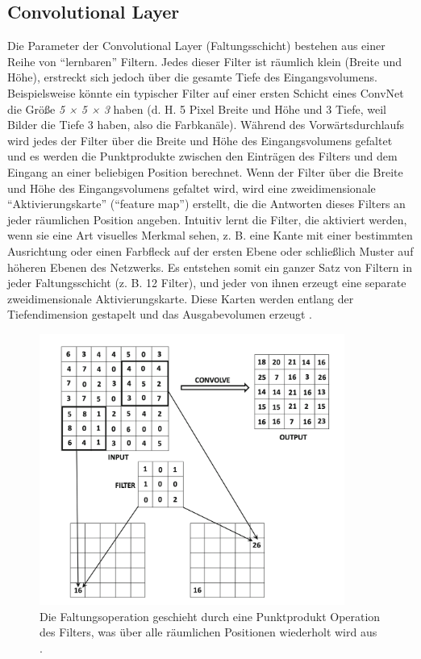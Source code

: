 \subsection{Convolutional Layer}

Die Parameter der Convolutional Layer (Faltungsschicht) bestehen aus einer Reihe von \enquote{lernbaren} Filtern. Jedes dieser Filter ist räumlich klein (Breite und Höhe), erstreckt sich jedoch über die gesamte Tiefe des Eingangsvolumens. Beispielsweise könnte ein typischer Filter auf einer ersten Schicht eines ConvNet die Größe \textit{5 × 5 × 3} haben (d. H. 5 Pixel Breite und Höhe und 3 Tiefe, weil Bilder die Tiefe 3 haben, also die Farbkanäle). Während des Vorwärtsdurchlaufs wird jedes der Filter über die Breite und Höhe des Eingangsvolumens gefaltet und es werden die Punktprodukte zwischen den Einträgen des Filters und dem Eingang an einer beliebigen Position berechnet. Wenn der Filter über die Breite und Höhe des Eingangsvolumens gefaltet wird, wird eine zweidimensionale \enquote{Aktivierungskarte} (\enquote{feature map}) erstellt, die die Antworten dieses Filters an jeder räumlichen Position angeben. Intuitiv lernt die Filter, die aktiviert werden, wenn sie eine Art visuelles Merkmal sehen, z. B. eine Kante mit einer bestimmten Ausrichtung oder einen Farbfleck auf der ersten Ebene oder schließlich Muster auf höheren Ebenen des Netzwerks. Es entstehen somit ein ganzer Satz von Filtern in jeder Faltungsschicht (z. B. 12 Filter), und jeder von ihnen erzeugt eine separate zweidimensionale Aktivierungskarte. Diese Karten werden entlang der Tiefendimension gestapelt und das Ausgabevolumen erzeugt \cite*{StanfordUniversityCoursecs231n2018a}.

\begin{figure}[H]
    \centering
    \includegraphics[width=10cm]{kapitel2/conv_layers.png}
    \caption[Die Faltung in einem CNN]{Die Faltungsoperation geschieht durch eine Punktprodukt Operation des Filters, was über alle räumlichen Positionen wiederholt wird aus \cite*[321]{Aggarwal2018}.}
    \label{Kap2:Conv}
\end{figure}

